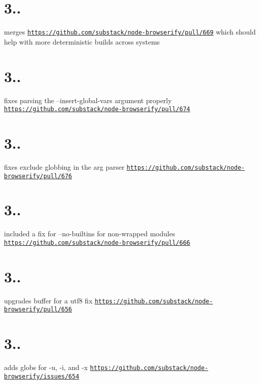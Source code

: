 \section*{3..}

merges \href{https://github.com/substack/node-browserify/pull/669}{\tt https\+://github.\+com/substack/node-\/browserify/pull/669} which should help with more deterministic builds across systems

\section*{3..}

fixes parsing the --insert-\/global-\/vars argument properly \href{https://github.com/substack/node-browserify/pull/674}{\tt https\+://github.\+com/substack/node-\/browserify/pull/674}

\section*{3..}

fixes exclude globbing in the arg parser \href{https://github.com/substack/node-browserify/pull/676}{\tt https\+://github.\+com/substack/node-\/browserify/pull/676}

\section*{3..}

included a fix for --no-\/builtins for non-\/wrapped modules \href{https://github.com/substack/node-browserify/pull/666}{\tt https\+://github.\+com/substack/node-\/browserify/pull/666}

\section*{3..}

upgrades buffer for a utf8 fix \href{https://github.com/substack/node-browserify/pull/656}{\tt https\+://github.\+com/substack/node-\/browserify/pull/656}

\section*{3..}

adds globs for -\/u, -\/i, and -\/x \href{https://github.com/substack/node-browserify/issues/654}{\tt https\+://github.\+com/substack/node-\/browserify/issues/654}

